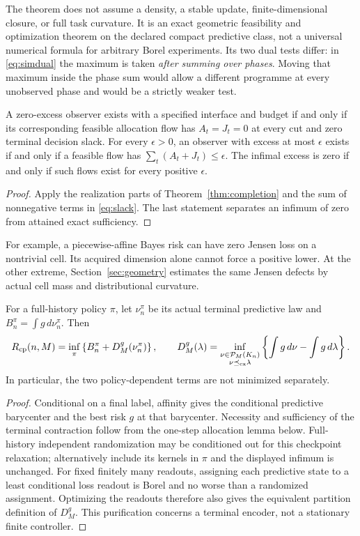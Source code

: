 The theorem does not assume a density, a stable update, finite-dimensional closure, or full task curvature. It is an exact geometric feasibility and optimization theorem on the declared compact predictive class, not a universal numerical formula for arbitrary Borel experiments. Its two dual tests differ: in \eqref{eq:simdual} the maximum is taken \emph{after summing over phases}. Moving that maximum inside the phase sum would allow a different programme at every unobserved phase and would be a strictly weaker test.

\begin{corollary}\label{cor:zero}
A zero-excess observer exists with a specified interface and budget if and only if its corresponding feasible allocation flow has $A_t=J_t=0$ at every cut and zero terminal decision slack. For every $\epsilon>0$, an observer with excess at most $\epsilon$ exists if and only if a feasible flow has $\sum_t(A_t+J_t)\le\epsilon$. The infimal excess is zero if and only if such flows exist for every positive $\epsilon$.
\end{corollary}
\begin{proof}
Apply the realization parts of Theorem~\ref{thm:completion} and the sum of nonnegative terms in \eqref{eq:slack}. The last statement separates an infimum of zero from attained exact sufficiency.
\end{proof}
For example, a piecewise-affine Bayes risk can have zero Jensen loss on a nontrivial cell. Its acquired dimension alone cannot force a positive lower. At the other extreme, Section~\ref{sec:geometry} estimates the same Jensen defects by actual cell mass and distributional curvature.

\begin{proposition}\label{prop:checkpoint}
For a full-history policy $\pi$, let $\nu_n^\pi$ be its actual terminal predictive law and $B_n^\pi=\int g\,d\nu_n^\pi$. Then
\begin{equation}\label{eq:checkpoint}
 R_{\mathrm{cp}}(n,M)=\inf_\pi\left\{B_n^\pi+D_M^g(\nu_n^\pi)\right\},\qquad
 D_M^g(\lambda)=\inf_{\substack{\nu\in\mathcal P_M(K_n)\\\nu\preceq_{\rm cx}\lambda}}
                      \left\{\int g\,d\nu-\int g\,d\lambda\right\}.
\end{equation}
In particular, the two policy-dependent terms are not minimized separately.
\end{proposition}
\begin{proof}
Conditional on a final label, affinity gives the conditional predictive barycenter and the best risk $g$ at that barycenter. Necessity and sufficiency of the terminal contraction follow from the one-step allocation lemma below. Full-history independent randomization may be conditioned out for this checkpoint relaxation; alternatively include its kernels in $\pi$ and the displayed infimum is unchanged. For fixed finitely many readouts, assigning each predictive state to a least conditional loss readout is Borel and no worse than a randomized assignment. Optimizing the readouts therefore also gives the equivalent partition definition of $D_M^g$. This purification concerns a terminal encoder, not a stationary finite controller.
\end{proof}
